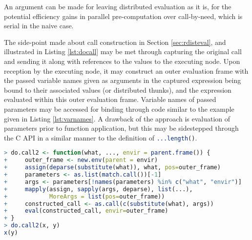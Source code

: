 An argument can be made for leaving distributed evaluation as it is, for the potential efficiency gains in parallel pre-computation over call-by-need, which is serial in the naive case.

The side-point made about call construction in Section \cref{sec:rdisteval}, and illustrated in Listing \cref{lst:docall} may be met through capturing the original call and sending it along with references to the values to the executing node.
Upon reception by the executing node, it may construct an outer evaluation frame with the passed variable names given as arguments in the captured expression being bound to their associated values (or distributed thunks)\cite{ingerman1961thunks}, and the expression evaluated within this outer evaluation frame.
Variable names of passed parameters may be accessed for binding through code similar to the example given in Listing \cref{lst:varnames}.
A drawback of the approach is evaluation of parameters prior to function application, but this may be sidestepped through the C API in a similar manner to the definition of \lstinline[language=R]{...length()}\cite{abelson1996sicp:order}.

\begin{lstlisting}[language=R,float,caption={Access to variable names given as formal parameters to a function call using x and y as defined in Listing \cref{lst:docall}},label=lst:varnames]
> do.call2 <- function(what, ..., envir = parent.frame()) {
+     outer_frame <- new.env(parent = envir)
+     assign(deparse(substitute(what)), what, pos=outer_frame)
+     parameters <- as.list(match.call())[-1]
+     args <- parameters[!names(parameters) %in% c("what", "envir")]
+     mapply(assign, sapply(args, deparse), list(...),
+            MoreArgs = list(pos=outer_frame))
+     constructed_call <- as.call(c(substitute(what), args))
+     eval(constructed_call, envir=outer_frame)
+ }
> do.call2(x, y)
x(y)
\end{lstlisting}
